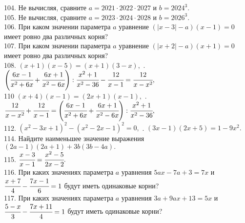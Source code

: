 104. Не вычисляя, сравните $a=2021\cdot2022\cdot2027$ и $b=2024^3.$\\
105. Не вычисляя, сравните $a=2023\cdot2024\cdot2028$ и $b=2026^3.$\\
106. При каком значении параметра $a$ уравнение $(|x-3|-a)(x-1)=0$ имеет ровно два различных корня?\\
107. При каком значении параметра $a$ уравнение $(|x+2|-a)(x+1)=0$ имеет ровно два различных корня?\\
108. $(x+1)(x-5)=(x+1)(3-x),$ . $\left(\cfrac{6x-1}{x^2+6x}+\cfrac{6x+1}{x^2-6x}\right):\cfrac{x^2+1}{x^2-36}-\cfrac{12}{x-1}=\cfrac{12}{x-x^2},$\\
110 $(x+4)(x-1)=(2x+1)(x-1),$ . $\cfrac{12}{x-x^2}+\cfrac{12}{x-1}=\left(\cfrac{6x-1}{x^2+6x}+\cfrac{6x+1}{x^2-6x}\right):\cfrac{x^2+1}{x^2-36},$\\
112. $(x^2-3x+1)^2-(x^2-2x-1)^2=0,$ . $(3x-1)(2x+5)=1-9x^2.$\\
114. Найдите наименьшее значение выражения $(2a-1)(2a+1)+3b(3b-4a).$\\
115. $\cfrac{x-3}{x-1}=\cfrac{x^2-5}{2x-2}.$\\
116. При каких значениях параметра $a$ уравнения $5ax - 7a + 3 = 7x$ и $\cfrac{x+7}{4}-\cfrac{7x-1}{6}=1$ будут иметь одинаковые корни?\\
117. При каких значениях параметра $a$ уравнения $3a + 9ax + 13 = 5x$ и $\cfrac{5-x}{3}-\cfrac{7x+11}{4}=1$ будут иметь одинаковые корни?
\newpage
